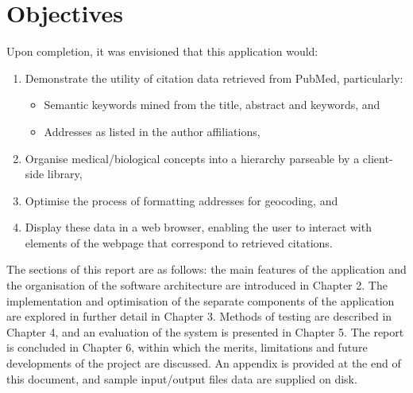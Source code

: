 \documentclass[Report.tex]{subfiles}
\begin{document}
\section{Objectives}
Upon completion, it was envisioned that this application would:

\begin{enumerate}
\item Demonstrate the utility of citation data retrieved from PubMed, particularly:
	\begin{itemize}
	\item Semantic keywords mined from the title, abstract and keywords, and
	\item Addresses as listed in the author affiliations,
	\end{itemize}
\item Organise medical/biological concepts into a hierarchy parseable by a client-side library,
\item Optimise the process of formatting addresses for geocoding, and 
\item Display these data in a web browser, enabling the user to interact with elements of the webpage that correspond to retrieved citations.
\end{enumerate}

\noindent The sections of this report are as follows: the main features of the application and the organisation of the software architecture are introduced in Chapter 2. The implementation and optimisation of the separate components of the application are explored in further detail in Chapter 3. Methods of testing are described in Chapter 4, and an evaluation of the system is presented in Chapter 5. The report is concluded in Chapter 6, within which the merits, limitations and future developments of the project are discussed. An appendix is provided at the end of this document, and sample input/output files data are supplied on disk.
\end{document}
